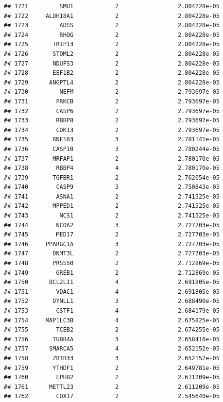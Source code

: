 \documentclass[
]{article}
\begin{document}
\begin{verbatim}
## 1721         SMU1            2                 2.804228e-05
## 1722     ALDH18A1            2                 2.804228e-05
## 1723         ADSS            2                 2.804228e-05
## 1724         RHOG            2                 2.804228e-05
## 1725       TRIP13            2                 2.804228e-05
## 1726       STOML2            2                 2.804228e-05
## 1727       NDUFS3            2                 2.804228e-05
## 1728       EEF1B2            2                 2.804228e-05
## 1729      ANGPTL4            2                 2.804228e-05
## 1730         NEFM            2                 2.793697e-05
## 1731        PRKCB            2                 2.793697e-05
## 1732        CASP6            2                 2.793697e-05
## 1733        RBBP8            2                 2.793697e-05
## 1734        CDK13            2                 2.793697e-05
## 1735       RNF183            3                 2.781141e-05
## 1736       CASP10            3                 2.780244e-05
## 1737       MRFAP1            2                 2.780170e-05
## 1738        RBBP4            4                 2.780170e-05
## 1739       TGFBR1            2                 2.762054e-05
## 1740        CASP9            3                 2.750843e-05
## 1741        ASNA1            2                 2.741525e-05
## 1742       MPPED1            2                 2.741525e-05
## 1743         NCS1            2                 2.741525e-05
## 1744        NCOA2            3                 2.727703e-05
## 1745        MED17            2                 2.727703e-05
## 1746     PPARGC1A            3                 2.727703e-05
## 1747       DNMT3L            2                 2.727703e-05
## 1748       PRSS50            2                 2.712869e-05
## 1749        GREB1            2                 2.712869e-05
## 1750      BCL2L11            4                 2.691805e-05
## 1751        VDAC1            4                 2.691805e-05
## 1752       DYNLL1            3                 2.688490e-05
## 1753        CSTF1            4                 2.684179e-05
## 1754     MAP1LC3B            4                 2.675825e-05
## 1755        TCEB2            2                 2.674255e-05
## 1756       TUBB4A            3                 2.658416e-05
## 1757      SMARCA5            4                 2.652152e-05
## 1758       ZBTB33            3                 2.652152e-05
## 1759       YTHDF1            2                 2.649781e-05
## 1760        EPHB2            2                 2.611209e-05
## 1761      METTL23            2                 2.611209e-05
## 1762        COX17            2                 2.545640e-05

\end{verbatim}
\end{document}
